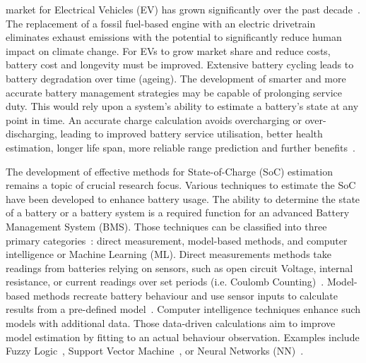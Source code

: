  market for Electrical Vehicles (EV) has grown significantly over the past decade~\cite{state-ev-australia}.
The replacement of a fossil fuel-based engine with an electric drivetrain eliminates exhaust emissions with the potential to significantly reduce human impact on climate change.
For EVs to grow market share and reduce costs, battery cost and longevity must be improved.
Extensive battery cycling leads to battery degradation over time (ageing).
The development of smarter and more accurate battery management strategies may be capable of prolonging service duty.
This would rely upon a system's ability to estimate a battery's state at any point in time.
An accurate charge calculation avoids overcharging or over-discharging, leading to improved battery service utilisation, better health estimation, longer life span, more reliable range prediction and further benefits~\cite{calif_proper_2008}.

%
%
The development of effective methods for State-of-Charge (SoC) estimation remains a topic of crucial research focus.
Various techniques to estimate the SoC have been developed to enhance battery usage.
The ability to determine the state of a battery or a battery system is a required function for an advanced Battery Management System (BMS).
Those techniques can be classified into three primary categories~\cite{ali_towards_2019,ng_enhanced_2009,robust_SoC,6953745}: direct measurement, model-based methods, and computer intelligence or Machine Learning (ML).
Direct measurements methods take readings from batteries relying on sensors, such as open circuit Voltage, internal resistance, or current readings over set periods (i.e. Coulomb Counting)~\cite{ng_enhanced_2009,robust_SoC}.
Model-based methods recreate battery behaviour and use sensor inputs to calculate results from a pre-defined model~\cite{6953745}.
Computer intelligence techniques enhance such models with additional data.
Those data-driven calculations aim to improve model estimation by fitting to an actual behaviour observation.
Examples include Fuzzy Logic~\cite{malkhandi_fuzzy_2006}, Support Vector Machine~\cite{hansen_support_2005, anton_battery_2013}, or Neural Networks (NN)~\cite{song_lithium-ion_2018,Chemali2017,mamo_long_2020,jiao_gru-rnn_2020,xiao_accurate_2019,javid_adaptive_2020,zhang_deep_2020}.

